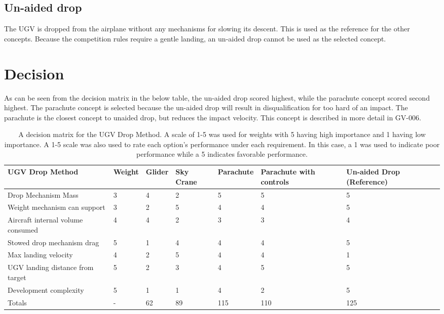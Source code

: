 \documentclass[]{auvsi_doc}
\begin{document}
\subsection{Un-aided drop}
The UGV is dropped from the airplane without any mechanisms for slowing its descent. This is used as the reference for the other concepts. Because the competition rules require a gentle landing, an un-aided drop cannot be used as the selected concept.

\section{Decision}

As can be seen from the decision matrix in the below table, the un-aided drop scored highest, while the parachute concept scored second highest. The parachute concept is selected because the un-aided drop will result in disqualification for too hard of an impact. The parachute is the closest concept to unaided drop, but reduces the impact velocity. This concept is described in more detail in GV-006.

\begin{table} [H]
\caption{A decision matrix for the UGV Drop Method. A scale of 1-5 was used for weights with 5 having high importance and 1 having low importance. A 1-5 scale was also used to rate each option’s performance under each requirement. In this case, a 1 was used to indicate poor performance while a 5 indicates favorable performance.}
\label{cont_cs_tab}
	\begin{tabular}{|>{\raggedright}p{2.5cm}| l | l | l | l | p{2.5cm} | p{2.5cm} |}
\hline

UGV Drop Method&Weight&Glider&Sky Crane& Parachute& Parachute with controls& Un-aided Drop (Reference) \\
\hline
Drop Mechanism Mass&                                3&4&2&5&5&5 \\
\hline
Weight mechanism can support&                       3&2&5&4&4&5 \\
\hline
Aircraft internal volume consumed&                  4&4&2&3&3&4 \\
\hline
Stowed drop mechanism drag&                         5&1&4&4&4&5 \\
\hline
Max landing velocity&                               4&2&5&4&4&1 \\
\hline
UGV landing distance from target&                   5&2&3&4&5&5 \\
\hline
Development complexity&                             5&1&1&4&2&5 \\
\hline
Totals&                                             -&62&89&115&110&125 \\
\hline

\end{tabular}
\end{table}
\end{document}

